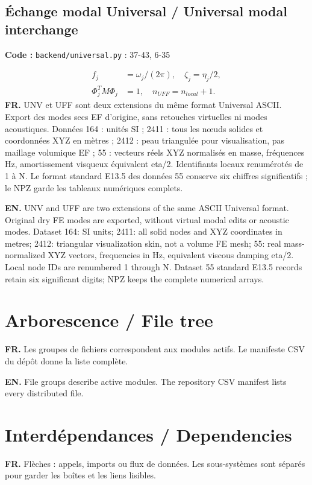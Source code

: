 \documentclass[10pt,a4paper]{article}
\newcommand{\FR}[1]{\textbf{FR.} #1\par}\newcommand{\EN}[1]{{\selectlanguage{english}\textbf{EN.} #1\par}}
\newcommand{\loc}[1]{{\small\color{ink}\textbf{Code :} #1\par}}
\begin{document}
\begin{samepage}\subsection{Échange modal Universal / Universal modal interchange}
\loc{\texttt{backend/universal.py} : 37-43, 6-35}
\begin{align}f_j&=\omega_j/(2\pi),\quad\zeta_j=\eta_j/2,\\\Phi_j^T M\Phi_j&=1,\quad n_{UFF}=n_{local}+1.\end{align}
\FR{UNV et UFF sont deux extensions du même format Universal ASCII. Export des modes secs EF d’origine, sans retouches virtuelles ni modes acoustiques. Données 164 : unités SI ; 2411 : tous les nœuds solides et coordonnées XYZ en mètres ; 2412 : peau triangulée pour visualisation, pas maillage volumique EF ; 55 : vecteurs réels XYZ normalisés en masse, fréquences Hz, amortissement visqueux équivalent eta/2. Identifiants locaux renumérotés de 1 à N. Le format standard E13.5 des données 55 conserve six chiffres significatifs ; le NPZ garde les tableaux numériques complets.}
\EN{UNV and UFF are two extensions of the same ASCII Universal format. Original dry FE modes are exported, without virtual modal edits or acoustic modes. Dataset 164: SI units; 2411: all solid nodes and XYZ coordinates in metres; 2412: triangular visualization skin, not a volume FE mesh; 55: real mass-normalized XYZ vectors, frequencies in Hz, equivalent viscous damping eta/2. Local node IDs are renumbered 1 through N. Dataset 55 standard E13.5 records retain six significant digits; NPZ keeps the complete numerical arrays.}
\end{samepage}
\clearpage\section{Arborescence / File tree}
\FR{Les groupes de fichiers correspondent aux modules actifs. Le manifeste CSV du dépôt donne la liste complète.}
\EN{File groups describe active modules. The repository CSV manifest lists every distributed file.}
\begin{center}\end{center}
\clearpage\section{Interdépendances / Dependencies}
\FR{Flèches : appels, imports ou flux de données. Les sous-systèmes sont séparés pour garder les boîtes et les liens lisibles.}
\end{document}
